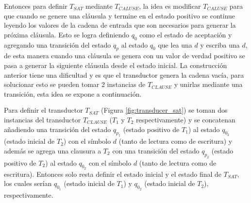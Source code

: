 \documentclass[12pt]{article}
\begin{document}
Entonces para definir $T_{SAT}$ mediante $T_{CALUSE}$, la idea es modificar $T_{CALUSE}$ para que cuando se genere
una cláusula y termine en el estado positivo se continue leyendo los valores de la cadena de entrada que son necesarios para generar
la próxima cláusula. Esto se logra definiendo $q_0$ como el estado de aceptación y agregando una transición del estado 
$q_p$ al estado $q_0$ que lea una $d$ y escriba una $d$, de esta manera cuando una cláusula se genera con un valor de 
verdad positivo se pasa a generar la siguiente cláusula desde el estado inicial. La construcción anterior tiene 
una dificultad y es que el transductor genera la cadena vacía, para solucionar esto se pueden tomar 2 instancias de 
$T_{CLAUSE}$ y unirlas mediante una transición, esta idea se expone a continuación.

Para definir el transductor $T_{SAT}$ (Figura \ref{fig:transducer_sat}) se toman dos instancias del transductor $T_{CLAUSE}$ ($T_1$ y $T_2$ respectivamente) y se concatenan añadiendo una transición del estado $q_{p_1}$ (estado positivo de $T_1$) al estado $q_{0_2}$ (estado inicial de $T_2$) con el símbolo $d$ (tanto de lectura como de escritura) y además se agrega una clausura a $T_2$ con una transición del estado $q_{p_2}$ (estado positivo de $T_2$) al estado $q_{0_2}$ con el símbolo $d$ (tanto de lectura como de escritura). Entonces solo resta definir el estado inicial y el estado final de $T_{SAT}$, los cuales serían $q_{0_1}$ (estado inicial de $T_1$) y $q_{0_2}$ (estado inicial de $T_2$), respectivamente.
\end{document}
